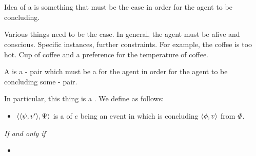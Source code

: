 \section{}
\label{cha:requs:requs}

\begin{note}
  Idea of a \requ{} is something that must be the case in order for the agent to be concluding.

  Various things need to be the case.
  In general, the agent must be alive and conscious.
  Specific instances, further constraints.
  For example, the coffee is too hot.
  Cup of coffee and a preference for the temperature of coffee.

  A  is a - pair which must be a  for the agent in order for the agent to be concluding some - pair.

  In particular, this thing is a \fc{}.
  We define  as follows:

  \begin{definition}[A \requ{0}]
    \label{def:requ}


    \begin{itemize}
    \item
      \(\langle \langle \psi, v' \rangle, \Psi \rangle\) is a \emph{\requ{}} of \(e\) being an event in which \vAgent{} is concluding \(\langle \phi, v \rangle\) from \(\Phi\).
    \end{itemize}

    \emph{If and only if}

    \begin{itemize}
    \item
    \end{itemize}
    \vspace{-\baselineskip}
  \end{definition}


\end{note}

